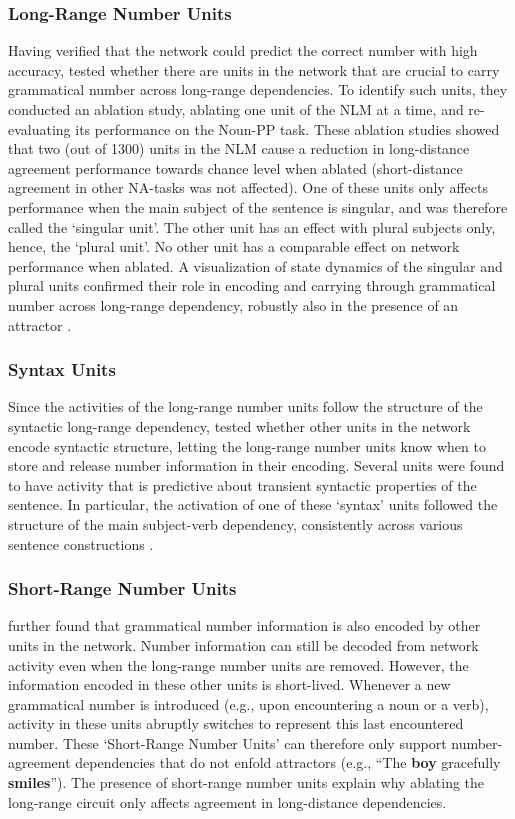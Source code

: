 \subsubsection{Long-Range Number Units}
Having verified that the network could predict the correct number with high accuracy, \citet{lakretz2019emergence} tested whether there are units in the network that are crucial to carry grammatical number across long-range dependencies.  
To identify such units, they conducted an ablation study, ablating one unit of the NLM at a time, and re-evaluating its performance on the Noun-PP task. 
These ablation studies showed that two (out of 1300) units in the NLM cause a reduction in long-distance agreement performance towards chance level when ablated (short-distance agreement in other NA-tasks was not affected). 
One of these units only affects performance when the main subject of the sentence is singular, and was therefore called the `singular unit'. 
The other unit has an effect with plural subjects only, hence, the `plural unit'. 
No other unit has a comparable effect on network performance when ablated. 
A visualization of state dynamics of the singular and plural units confirmed their role in encoding and carrying through grammatical number across long-range dependency, robustly also in the presence of an attractor \citep[Figure 1 in][]{lakretz2019emergence}.

\subsubsection{Syntax Units}
Since the activities of the long-range number units follow the structure of the syntactic long-range dependency, \citet{lakretz2019emergence} tested whether other units in the network encode syntactic structure, letting the long-range number units know when to store and release number information in their encoding. Several units were found to have activity that is predictive about transient syntactic properties of the sentence. In particular, the activation of one of these `syntax' units followed the structure of the main subject-verb dependency, consistently across various sentence constructions \citep[Figure 3 in][]{lakretz2019emergence}.

\subsubsection{Short-Range Number Units}
\citet{lakretz2019emergence} further found that grammatical number information is also encoded by other units in the network. 
Number information can still be decoded from network activity even when the long-range number units are removed. 
However, the information encoded in these other units is short-lived. Whenever a new grammatical number  is
introduced (e.g., upon encountering a noun or a verb), activity in
these units abruptly switches to represent this last encountered
number. These `Short-Range Number Units' can therefore only support number-agreement dependencies that do not
enfold attractors (e.g., ``The \textbf{boy} gracefully
\textbf{smiles}''). The presence of short-range number units explain why ablating the long-range circuit only affects agreement in long-distance dependencies.

